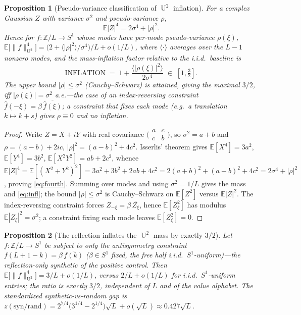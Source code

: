 \documentclass[11pt]{article}
\newtheorem{proposition}{Proposition}
\theoremstyle{definition}
\newcommand{\Z}{\mathbb{Z}}
\DeclareMathOperator{\Uk}{U}
\begin{document}
\begin{proposition}[Pseudo-variance classification of $\Uk^2$
inflation]\label{prop:pseudovar}
For a complex Gaussian $Z$ with variance $\sigma^2$ and pseudo-variance
$\rho$,
\begin{equation}\label{eq:fourth}
\mathbb E|Z|^4=2\sigma^4+|\rho|^2 .
\end{equation}
Hence for $f\colon\Z/L\to S^1$ whose modes have per-mode pseudo-variance
$\rho(\xi)$,
$\mathbb E\big[\|f\|_{\Uk^2}^4\big]
=\big(2+\langle|\rho|^2\rangle/\sigma^4\big)/L+o(1/L)$, where
$\langle\cdot\rangle$ averages over the $L-1$ nonzero modes, and the
mass-inflation factor relative to the i.i.d.\ baseline is
\begin{equation}\label{eq:infl}
\text{INFLATION}\;=\;1+\frac{\langle|\rho(\xi)|^2\rangle}{2\sigma^4}\;\in\;[1,\tfrac32].
\end{equation}
The upper bound $|\rho|\le\sigma^2$ (Cauchy--Schwarz) is attained, giving
the maximal $3/2$, \emph{iff} $|\rho(\xi)|=\sigma^2$ a.e.---the case of an
index-reversing constraint $\hat f(-\xi)=\beta\,\overline{\hat f(\xi)}$;
a constraint that fixes each mode (e.g.\ a translation $k\mapsto k+s$)
gives $\rho\equiv0$ and no inflation.
\end{proposition}

\begin{proof}
Write $Z=X+iY$ with real covariance $\big(\begin{smallmatrix}a&c\\
c&b\end{smallmatrix}\big)$, so $\sigma^2=a+b$ and $\rho=(a-b)+2ic$,
$|\rho|^2=(a-b)^2+4c^2$. Isserlis' theorem gives $\mathbb E[X^4]=3a^2$,
$\mathbb E[Y^4]=3b^2$, $\mathbb E[X^2Y^2]=ab+2c^2$, whence
$\mathbb E|Z|^4=\mathbb E[(X^2+Y^2)^2]=3a^2+3b^2+2ab+4c^2
=2(a+b)^2+(a-b)^2+4c^2=2\sigma^4+|\rho|^2$, proving \eqref{eq:fourth}.
Summing over modes and using $\sigma^2=1/L$ gives the mass and
\eqref{eq:infl}; the bound $|\rho|\le\sigma^2$ is Cauchy--Schwarz on
$\mathbb E[Z^2]$ versus $\mathbb E|Z|^2$. The index-reversing constraint
forces $Z_{-\xi}=\beta\,\overline{Z_\xi}$, hence
$\mathbb E[Z_\xi^2]$ has modulus $\mathbb E|Z_\xi|^2=\sigma^2$; a constraint
fixing each mode leaves $\mathbb E[Z_\xi^2]=0$.
\end{proof}

\begin{proposition}[The reflection inflates the $\Uk^2$ mass by exactly
$3/2$]\label{prop:scaling}
Let $f\colon\Z/L\to S^1$ be subject to \emph{only} the antisymmetry
constraint $f(L{+}1{-}k)=\beta\,\overline{f(k)}$ ($\beta\in S^1$ fixed, the
free half i.i.d.\ $S^1$-uniform)---the reflection-only synthetic of the
positive control. Then $\mathbb E\big[\|f\|_{\Uk^2}^4\big]=3/L+o(1/L)$,
versus $2/L+o(1/L)$ for i.i.d.\ $S^1$-uniform entries; the ratio is
exactly $3/2$, independent of $L$ and of the value alphabet. The
standardized synthetic-vs-random gap is
$z(\mathrm{syn/rand})=2^{7/4}\big(3^{1/4}-2^{1/4}\big)\sqrt L+o(\sqrt L)
\approx0.427\sqrt L$.
\end{proposition}
\end{document}
